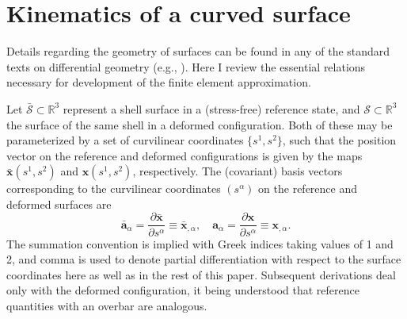 \documentclass[
pre,
 twocolumn,
amsmath,
amssymb
]{revtex4}
\begin{document}
\section{Kinematics of a curved surface}\label{sec:kinematics} %
Details regarding the geometry of surfaces can be found in any of the
standard texts on differential geometry (e.g., \citep{Sokolnikoff,
DoCarmo}).  Here I review the essential relations necessary for
development of the finite element approximation. 

Let $\bar{\mathcal{S}}\subset\mathbb{R}^3$ represent a shell surface
in a (stress-free) reference state, and
$\mathcal{S}\subset\mathbb{R}^3$ the surface of the same shell in a
deformed configuration.  Both of these may be parameterized by a set
of curvilinear coordinates $\{s^{1}, s^{2}\}$, such that the position
vector on the reference and deformed configurations is given by the
maps $\bar{\bm{x}}(s^{1}, s^{2})$ and $\bm{x}(s^{1}, s^{2})$,
respectively.  The (covariant) basis vectors corresponding to the
curvilinear coordinates $(s^\alpha)$ on the reference and deformed
surfaces are
%
%
\begin{equation}\label{eq:basis-vector}
  \bar{\bm{a}}_\alpha = \frac{\partial \bar{\bm{x}}}{\partial s^\alpha} 
  \equiv \bar{\bm{x}}_{,\alpha} , \quad
  \bm{a}_\alpha = \frac{\partial \bm{x}}{\partial s^\alpha} 
  \equiv \bm{x}_{,\alpha} .
\end{equation}
%
The summation convention is implied with Greek indices taking values
of 1 and 2, and comma is used to denote partial differentiation with
respect to the surface coordinates here as well as in the rest of this
paper. Subsequent derivations deal only with the deformed
configuration, it being understood that reference quantities with an
overbar are analogous.  
\end{document}
